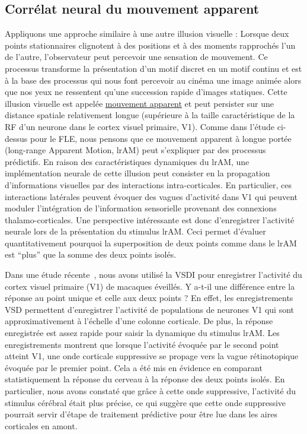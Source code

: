 \subsection{Corrélat neural du mouvement apparent}
Appliquons une approche similaire à une autre illusion visuelle :
Lorsque deux points stationnaires clignotent à des positions et à des
moments rapprochés l'un de l'autre, l'observateur peut percevoir une
sensation de mouvement. Ce processus transforme la présentation d'un motif
discret en un motif continu et est à la base des processus qui nous font percevoir au cinéma une image animée alors que nos yeux ne ressentent qu'une succession rapide d'images statiques.
Cette illusion visuelle est appelée
\href{https://en.wikipedia.org/wiki/Beta_movement}{mouvement apparent}
et peut persister sur une distance spatiale relativement longue (supérieure à la
taille caractéristique de la RF d'un neurone dans le cortex visuel
primaire, V1). Comme dans l'étude ci-dessus pour le FLE, nous pensons que ce
mouvement apparent à longue portée (long-range Apparent Motion, lrAM) peut s'expliquer par des
processus prédictifs. En raison des caractéristiques dynamiques du lrAM,
une implémentation neurale de cette illusion peut consister en la
propagation d'informations visuelles par des interactions
intra-corticales. En particulier, ces interactions latérales peuvent
évoquer des vagues d'activité dans V1 qui peuvent moduler l'intégration de
l'information sensorielle provenant des connexions thalamo-corticales.
Une perspective intéressante est donc d'enregistrer l'activité neurale
lors de la présentation du stimulus lrAM. Ceci permet d'évaluer
quantitativement pourquoi la superposition de deux points comme dans le
lrAM est ``plus'' que la somme des deux points isolés.

Dans une étude récente~\citep{Chemla19}, nous avons utilisé la VSDI
pour enregistrer l'activité du cortex visuel primaire (V1) de macaques
éveillés. Y a-t-il une différence entre la réponse au point unique et
celle aux deux points ? En effet, les enregistrements VSD permettent
d'enregistrer l'activité de populations de neurones V1 qui sont
approximativement à l'échelle d'une colonne corticale. De plus, la
réponse enregistrée est assez rapide pour saisir la dynamique du
stimulus lrAM. Les enregistrements montrent que lorsque l'activité
évoquée par le second point atteint V1, une onde corticale suppressive se
propage vers la vague rétinotopique évoquée par le premier point. Cela a
été mis en évidence en comparant statistiquement la réponse du cerveau à
la réponse des deux points isolés. En particulier, nous avons constaté
que grâce à cette onde suppressive, l'activité du stimulus cérébral
était plus précise, ce qui suggère que cette onde suppressive pourrait
servir d'étape de traitement prédictive pour être lue dans les aires
corticales en amont.

